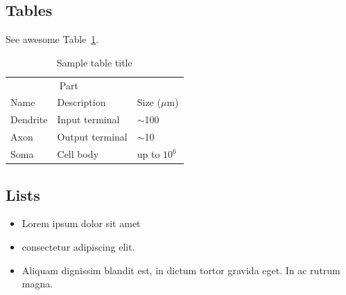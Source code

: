 \documentclass[a4paper]{article}
\begin{document}
\subsection{Tables}
See awesome Table~\ref{tab:table}.

\begin{table}
 \caption{Sample table title}
  \centering
  \begin{tabular}{lll}
    \toprule
    \multicolumn{2}{c}{Part}                   \\
    \cmidrule(r){1-2}
    Name     & Description     & Size ($\mu$m) \\
    \midrule
    Dendrite & Input terminal  & $\sim$100     \\
    Axon     & Output terminal & $\sim$10      \\
    Soma     & Cell body       & up to $10^6$  \\
    \bottomrule
  \end{tabular}
  \label{tab:table}
\end{table}

\subsection{Lists}
\begin{itemize}
\item Lorem ipsum dolor sit amet
\item consectetur adipiscing elit.
\item Aliquam dignissim blandit est, in dictum tortor gravida eget. In ac rutrum magna.
\end{itemize}









\end{document}
